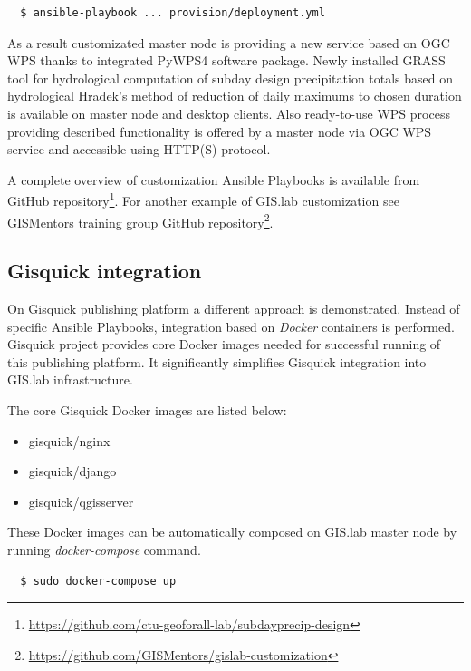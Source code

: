 \documentclass{isprs}
\begin{document}
\begin{lstlisting}
  $ ansible-playbook ... provision/deployment.yml
\end{lstlisting}

As a result customizated master node is providing a new service based
on OGC WPS thanks to integrated PyWPS4 software package. Newly
installed GRASS tool for hydrological computation of subday design
precipitation totals based on hydrological Hradek's method of
reduction of daily maximums to chosen duration is available on master
node and desktop clients. Also ready-to-use WPS process providing
described functionality is offered by a master node via OGC WPS
service and accessible using HTTP(S) protocol.

A complete overview of customization Ansible Playbooks is available
from GitHub
repository\footnote{\url{https://github.com/ctu-geoforall-lab/subdayprecip-design}}. For
another example of GIS.lab customization see GISMentors training group
GitHub
repository\footnote{\url{https://github.com/GISMentors/gislab-customization}}.

\subsection{Gisquick integration}

On Gisquick publishing platform a different approach is
demonstrated. Instead of specific Ansible Playbooks, integration based
on \textit{Docker} containers is performed. Gisquick project
provides core Docker images needed for successful running of this
publishing platform. It significantly simplifies Gisquick integration
into GIS.lab infrastructure.

The core Gisquick Docker images are listed below:

\begin{itemize}
\setlength\itemsep{0em}\setlength\parskip{0em}\setlength\topsep{0em}\setlength\partopsep{0em}\setlength\parsep{0em}
\item{gisquick/nginx}
\item{gisquick/django}
\item{gisquick/qgisserver}
\end{itemize}

These Docker images can be automatically composed on GIS.lab master
node by running \textit{docker-compose} command.

\begin{lstlisting}
  $ sudo docker-compose up
\end{lstlisting}
\end{document}
